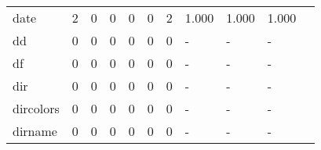 \begin{longtable}{lp{1.2cm}p{1.2cm}p{1.2cm}p{1.2cm}p{1.2cm}p{1.2cm}p{1.2cm}p{1.2cm}p{1.2cm}p{1.2cm}}
date      &                                     2 &                                                  0 &                                                  0 &                                                  0 &                                                  0 &                                                  2 &                                              1.000 &                                              1.000 &                                              1.000 \\
dd        &                                     0 &                                                  0 &                                                  0 &                                                  0 &                                                  0 &                                                  0 &                                                  - &                                                  - &                                                  - \\
df        &                                     0 &                                                  0 &                                                  0 &                                                  0 &                                                  0 &                                                  0 &                                                  - &                                                  - &                                                  - \\
dir       &                                     0 &                                                  0 &                                                  0 &                                                  0 &                                                  0 &                                                  0 &                                                  - &                                                  - &                                                  - \\
dircolors &                                     0 &                                                  0 &                                                  0 &                                                  0 &                                                  0 &                                                  0 &                                                  - &                                                  - &                                                  - \\
dirname   &                                     0 &                                                  0 &                                                  0 &                                                  0 &                                                  0 &                                                  0 &                                                  - &                                                  - &                                                  - \\

\end{longtable}
